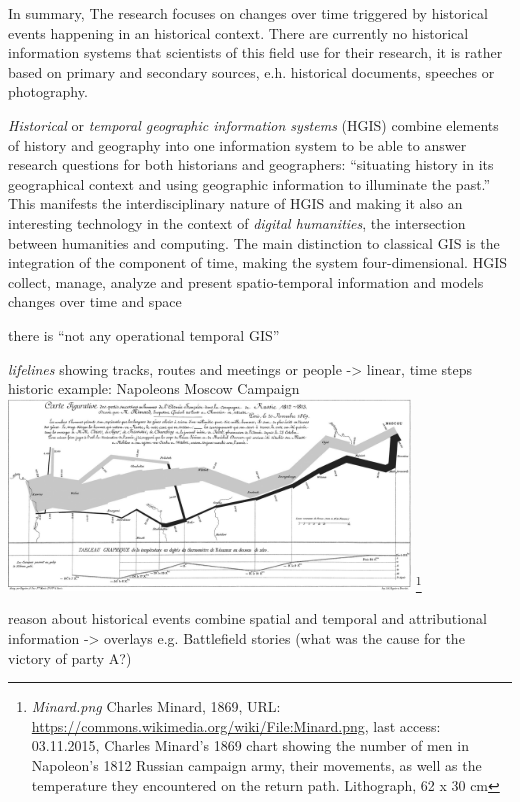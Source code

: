 In summary,  The research focuses on changes over time triggered by historical events happening in an historical context. There are currently no historical information systems that scientists of this field use for their research, it is rather based on primary and secondary sources, e.h. historical documents, speeches or photography.

\emph{Historical} or \emph{temporal geographic information systems} (HGIS) combine elements of history and geography into one information system to be able to answer research questions for both historians and geographers: ``situating history in its geographical context and using geographic information to illuminate the past.''
\cite[p. 3]{knowles2008placing}
This manifests the interdisciplinary nature of HGIS and making it also an interesting technology in the context of \emph{digital humanities}, the intersection between humanities and computing. The main distinction to classical GIS is the integration of the component of time, making the system four-dimensional. HGIS collect, manage, analyze and present spatio-temporal information and models changes over time and space
\cite[p. xii]{knowles2002past}

there is ``not any operational temporal GIS''
\cite[p. 5]{raza12}

  \emph{lifelines}
    showing tracks, routes and meetings or people -> linear, time steps
    historic example: Napoleons Moscow Campaign
    \includegraphics[width=0.8\textwidth]{graphics/basics/napoleon_march_moscow.png}
    \footnote{
      \textit{Minard.png}
      Charles Minard, 1869,
      URL: \url{https://commons.wikimedia.org/wiki/File:Minard.png},
      last access: 03.11.2015,
      Charles Minard's 1869 chart showing the number of men in Napoleon’s 1812 Russian campaign army, their movements, as well as the temperature they encountered on the return path. Lithograph, 62 x 30 cm
    }
    \cite[pp. 188-191]{knowles2008placing}

  reason about historical events
    combine spatial and temporal and attributional information -> overlays
    e.g. Battlefield stories (what was the cause for the victory of party A?)

